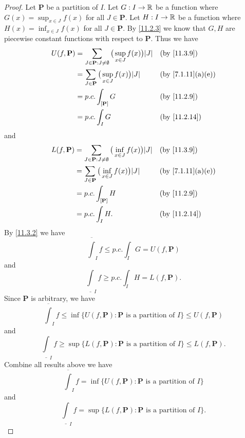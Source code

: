 \begin{proof}
  Let \(\mathbf{P}\) be a partition of \(I\).
  Let \(G : I \to \mathbb{R}\) be a function where \(G(x) = \sup_{x \in J} f(x)\) for all \(J \in \mathbf{P}\).
  Let \(H : I \to \mathbb{R}\) be a function where \(H(x) = \inf_{x \in J} f(x)\) for all \(J \in \mathbf{P}\).
  By \cref{11.2.3} we know that \(G, H\) are piecewise constant functions with respect to \(\mathbf{P}\).
  Thus we have
  \begin{align*}
    U(f, \mathbf{P}) & = \sum_{J \in \mathbf{P} : J \neq \emptyset} \big(\sup_{x \in J} f(x)\big) \abs{J} &  & \text{(by \cref{11.3.9})}       \\
                     & = \sum_{J \in \mathbf{P}} \big(\sup_{x \in J} f(x)\big) \abs{J}                    &  & \text{(by \cref{7.1.11}(a)(e))} \\
                     & = p.c. \int_{[\mathbf{P}]} G                                                       &  & \text{(by \cref{11.2.9})}       \\
                     & = p.c. \int_I G                                                                    &  & \text{(by \cref{11.2.14})}
  \end{align*}
  and
  \begin{align*}
    L(f, \mathbf{P}) & = \sum_{J \in \mathbf{P} : J \neq \emptyset} \big(\inf_{x \in J} f(x)\big) \abs{J} &  & \text{(by \cref{11.3.9})}       \\
                     & = \sum_{J \in \mathbf{P}} \big(\inf_{x \in J} f(x)\big) \abs{J}                    &  & \text{(by \cref{7.1.11}(a)(e))} \\
                     & = p.c. \int_{[\mathbf{P}]} H                                                       &  & \text{(by \cref{11.2.9})}       \\
                     & = p.c. \int_I H.                                                                   &  & \text{(by \cref{11.2.14})}
  \end{align*}
  By \cref{11.3.2} we have
  \[
    \overline{\int}_I f \leq p.c. \int_I G = U(f, \mathbf{P})
  \]
  and
  \[
    \underline{\int}_I f \geq p.c. \int_I H = L(f, \mathbf{P}).
  \]
  Since \(\mathbf{P}\) is arbitrary, we have
  \[
    \overline{\int}_I f \leq \inf\big\{U(f, \mathbf{P}) : \mathbf{P} \text{ is a partition of } I\big\} \leq U(f, \mathbf{P})
  \]
  and
  \[
    \underline{\int}_I f \geq \sup\big\{L(f, \mathbf{P}) : \mathbf{P} \text{ is a partition of } I\big\} \leq L(f, \mathbf{P}).
  \]
  Combine all results above we have
  \[
    \overline{\int}_I f = \inf\big\{U(f, \mathbf{P}) : \mathbf{P} \text{ is a partition of } I\big\}
  \]
  and
  \[
    \underline{\int}_I f = \sup\big\{L(f, \mathbf{P}) : \mathbf{P} \text{ is a partition of } I\big\}.
  \]
\end{proof}

